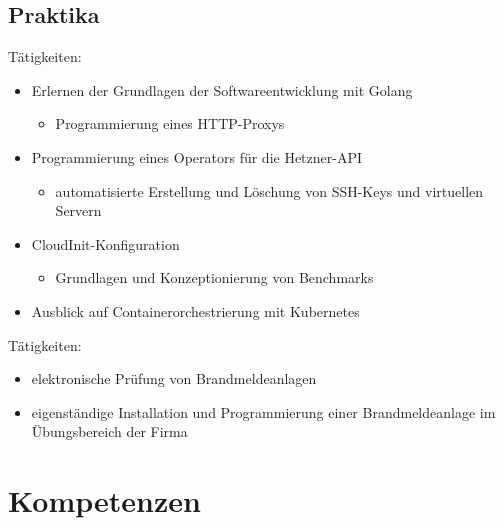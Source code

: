 \documentclass[11pt,a4paper,sans]{moderncv}        %
\begin{document}
\subsection{Praktika}
Tätigkeiten:
\begin{itemize}
\item Erlernen der Grundlagen der Softwareentwicklung mit Golang
  \begin{itemize}
  \item Programmierung eines HTTP-Proxys
  \end{itemize}
\item Programmierung eines Operators für die Hetzner-API
  \begin{itemize}
  \item automatisierte Erstellung und Löschung von SSH-Keys und virtuellen Servern
  \end{itemize}
\item CloudInit-Konfiguration
  \begin{itemize}
  \item Grundlagen und Konzeptionierung von Benchmarks
  \end{itemize}
  \item Ausblick auf Containerorchestrierung mit Kubernetes
\end{itemize}
\vspace{\baselineskip}
Tätigkeiten:
\begin{itemize}
  \item elektronische Prüfung von Brandmeldeanlagen
  \item eigenständige Installation und Programmierung einer Brandmeldeanlage im Übungsbereich der Firma
\end{itemize}

%
\section{Kompetenzen}
\end{document}
